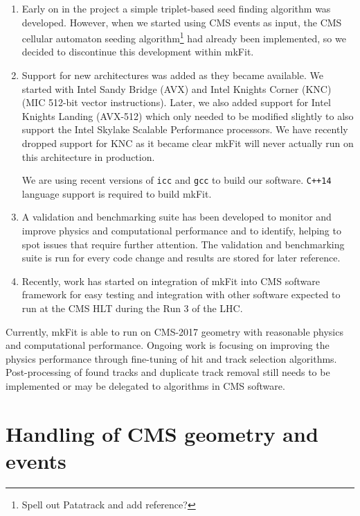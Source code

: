 \documentclass{webofc}
\def\mkfit{mkFit\xspace}
\def\stt#1{{\small\texttt{#1}}}
\begin{document}
\begin{enumerate}
\item Early on in the project a simple triplet-based seed finding algorithm
  was developed. However, when we started using CMS events as input, the CMS
  cellular automaton seeding algorithm\footnote{Spell out Patatrack and add
    reference?} had already been implemented, so we decided to discontinue
  this development within \mkfit.

\item Support for new architectures was added as they became
  available. We started with Intel Sandy Bridge (AVX) and Intel Knights
  Corner (KNC) (MIC 512-bit vector instructions). Later, we also added support for
  Intel Knights Landing (AVX-512) which only needed to be modified slightly
  to also support the Intel Skylake Scalable Performance processors. We have recently dropped
  support for KNC as it became clear \mkfit will never actually run
  on this architecture in production.

  We are using recent versions of \stt{icc} and \stt{gcc} to build our
  software. \stt{C++14} language support is required to build \mkfit.

\item A validation and benchmarking suite has been developed to monitor and
  improve physics and computational performance and to identify, helping to spot
  issues that require further attention. The validation and benchmarking suite
  is run for every code change and results are stored for later reference.

\item Recently, work has started on integration of \mkfit into CMS software
  framework for easy testing and integration with other software expected to
  run at the CMS HLT during the Run 3 of the LHC.

\end{enumerate}

Currently, \mkfit is able to run on CMS-2017 geometry with reasonable physics
and computational performance. Ongoing work is focusing on improving the
physics performance through fine-tuning of hit and track selection
algorithms. Post-processing of found tracks and duplicate track removal
still needs to be implemented or may be delegated to algorithms in CMS
software. 


\section{Handling of CMS geometry and events}
\label{sec:cms-geom-and-events}
\end{document}
